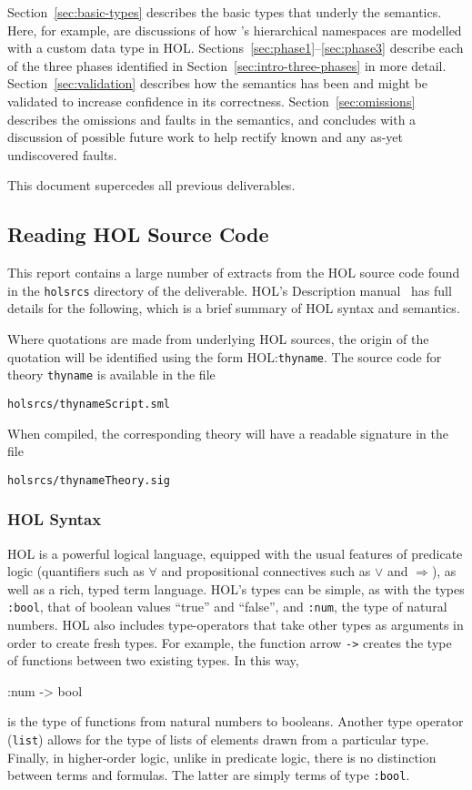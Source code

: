 \documentclass[11pt]{article}
\newcommand{\HOLfile}[1]{HOL:\texttt{#1}}
\begin{document}
Section~\ref{sec:basic-types} describes the basic types that underly
the semantics.  Here, for example, are discussions of how \cpp{}'s
hierarchical namespaces are modelled with a custom data type in
HOL. Sections~\ref{sec:phase1}--\ref{sec:phase3} describe each of the
three phases identified in Section~\ref{sec:intro-three-phases} in
more detail.  Section~\ref{sec:validation} describes how the semantics
has been and might be validated to increase confidence in its
correctness.  Section~\ref{sec:omissions} describes the omissions and
faults in the semantics, and concludes with a discussion of possible
future work to help rectify known and any as-yet undiscovered faults.


\vspace{1ex}
\noindent This document supercedes all previous deliverables.

\subsection{Reading  HOL Source Code}
\label{sec:reading-HOL}

This report contains a large number of extracts from the HOL source
code found in the \texttt{holsrcs} directory of the deliverable.
HOL's Description manual~\cite{HOLdescription} has full details for
the following, which is a brief summary of HOL syntax and semantics.

Where quotations are made from underlying HOL sources, the origin of
the quotation will be identified using the form \HOLfile{thyname}.
The source code for theory \texttt{thyname} is available in the file
\begin{alltt}
   holsrcs/thynameScript.sml
\end{alltt}
When compiled, the corresponding theory will have a readable
signature in the file
\begin{alltt}
   holsrcs/thynameTheory.sig
\end{alltt}


\subsubsection{HOL Syntax}

HOL is a powerful logical language, equipped with the usual features
of predicate logic (quantifiers such as $\forall$ and propositional
connectives such as $\lor$ and $\Rightarrow$), as well as a rich,
typed term language.  HOL's types can be simple, as with the types
\texttt{:bool}, that of boolean values ``true'' and ``false'', and
\texttt{:num}, the type of natural numbers.  HOL also includes
type-operators that take other types as arguments in order to create
fresh types.  For example, the function arrow \texttt{->} creates the
type of functions between two existing types.  In this way,
\begin{stdrule}
   :num -> bool
\end{stdrule}
is the type of functions from natural numbers to booleans.  Another
type operator (\texttt{list}) allows for the type of lists of elements
drawn from a particular type.  Finally, in higher-order logic, unlike
in predicate logic, there is no distinction between terms and
formulas.  The latter are simply terms of type \texttt{:bool}.
\end{document}
